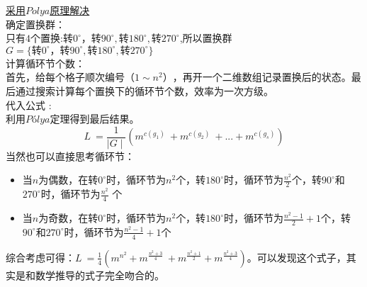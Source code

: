 \underline {采用$Polya$原理解决} \\
确定置换群： \\
只有$4$个置换:$转0^\circ ，转90^\circ,转180^\circ,转270^\circ$,所以置换群$G=\{转0^\circ ，转90^\circ,转180^\circ,转270^\circ\}$ \\
计算循环节个数： \\
首先，给每个格子顺次编号$（1\sim n^2）$，再开一个二维数组记录置换后的状态。最后通过搜索计算每个置换下的循环节个数，效率为一次方级。\\
代入公式 : \\
利用$Pólya$定理得到最后结果。\\
$$L \ = \frac{1}{\mid  G \mid}(m^{c(g_1)}\ + m^{c(g_2)}\ +... + m^{c(g_s)})$$
当然也可以直接思考循环节： \\
\begin{itemize}
\item 当$n$为偶数，在转$0^\circ$时，循环节为$n^2$个，转$180^\circ$时，循环节为$\frac{n^2}{2}$个，转$90^\circ$和$270^\circ$时，循环节为$\frac{n^2}{4}$ 个
\item 当$n$为奇数，在转$0^\circ$时，循环节为$n^2$个，转$180^\circ$时，循环节为$\frac{n^2 - 1}{2} + 1$个，转$90^\circ$和$270^\circ$时，循环节为$\frac{n^2 - 1}{4}+1$个
\end{itemize}
综合考虑可得：$L \ = \frac{1}{4}(m^{n^2} + m^{\frac{n^2+3}{4}}\ +m^{\frac{n^2+1}{2}} + m^{\frac{n^2+3}{4}})$。可以发现这个式子，其实是和数学推导的式子完全吻合的。
